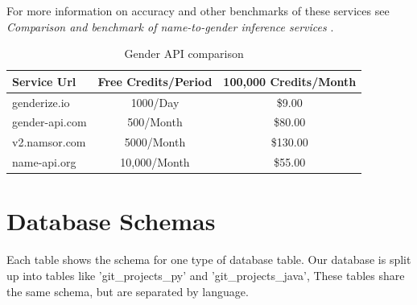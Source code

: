 \documentclass[12pt]{article}
\begin{document}
For more information on accuracy and other benchmarks of these services see \textit{Comparison and benchmark of name-to-gender inference services} \cite{Santamaria2018}.

\begin{table}[h!]
    \begin{center}
        \caption{Gender API comparison}
        \label{tab:gen_apis}
        \begin{tabular}{|l|c|c|}
            \hline
            \textbf{Service Url} & \textbf{Free Credits/Period} & \textbf{100,000 Credits/Month}\\
            \hline
            genderize.io & 1000/Day & \$9.00 \\
            gender-api.com & 500/Month & \$80.00 \\
            v2.namsor.com & 5000/Month & \$130.00 \\
            name-api.org & 10,000/Month & \$55.00 \\
            \hline
        \end{tabular}
    \end{center}
\end{table}


\newpage
\section{Database Schemas}
Each table shows the schema for one type of database table. Our database is split up into tables like 'git{\_}projects{\_}py' and 'git{\_}projects{\_}java', These tables share the same schema, but are separated by language.
\end{document}
